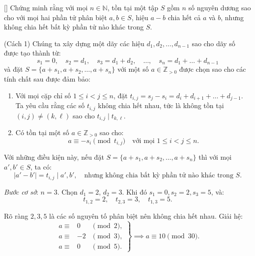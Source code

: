\documentclass[../09-contruction-methods.tex]{subfiles}
\begin{document}
\begin{example*}\label{example:USA-2015-TST-P2}[\textbf{}]
	Chứng minh rằng với mọi \( n \in \mathbb{N} \), tồn tại một tập \( S \) gồm \( n \) số nguyên dương sao cho với mọi hai phần tử phân biệt \( a, b \in S \),
	hiệu \( a - b \) chia hết cả \( a \) và \( b \), nhưng không chia hết bất kỳ phần tử nào khác trong \( S \).
\end{example*}

\begin{soln}(Cách 1)\footnotemark
	Chúng ta xây dựng một dãy các hiệu \( d_1, d_2, \dots, d_{n-1} \) sao cho dãy số được tạo thành từ:
	\[
		s_1 = 0, \quad s_2 = d_1, \quad s_3 = d_1 + d_2, \quad \dots, \quad s_n = d_1 + \dots + d_{n-1}
	\]
	và đặt \( S = \{ a + s_1, a + s_2, \dots, a + s_n \} \) với một số \( a \in \mathbb{Z}_{>0} \) được chọn sao cho các tính chất sau được đảm bảo:
	
	\begin{enumerate}[topsep=0pt, partopsep=0pt, itemsep=0pt, label=(\roman*)]
		\item Với mọi cặp chỉ số \( 1 \le i < j \le n \), đặt \( t_{i,j} = s_j - s_i = d_i + d_{i+1} + \dots + d_{j-1} \).
		Ta yêu cầu rằng các số \( t_{i,j} \) không chia hết nhau, tức là không tồn tại \( (i, j) \ne (k, \ell) \) sao cho \( t_{i,j} \mid t_{k,\ell} \).
		\item Có tồn tại một số \( a \in \mathbb{Z}_{>0} \) sao cho:
		\[
			a \equiv -s_i \pmod{t_{i,j}} \quad \text{với mọi } 1 \le i < j \le n.
		\]
	\end{enumerate}
	
	Với những điều kiện này, nếu đặt \( S = \{ a + s_1, a + s_2, \dots, a + s_n \} \) thì với mọi \( a', b' \in S \), ta có:
	\[
		|a' - b'| = t_{i,j} \mid a', b', \quad \text{nhưng không chia bất kỳ phần tử nào khác trong } S.
	\]
	
	\textit{Bước cơ sở}: \( n = 3 \). Chọn \( d_1 = 2 \), \( d_2 = 3 \). Khi đó \( s_1 = 0, s_2 = 2, s_3 = 5 \), và:
	\[
		t_{1,2} = 2, \quad t_{2,3} = 3, \quad t_{1,3} = 5.
	\]
	
	Rõ ràng \( 2, 3, 5 \) là các số nguyên tố phân biệt nên không chia hết nhau.  
	Giải hệ:
	\[
		\left.
		\begin{array}{rcl}
			a \equiv &0& \pmod{2}, \\
			a \equiv &-2& \pmod{3}, \\
			a \equiv &0& \pmod{5}.
		\end{array}
		\right\}
		\implies a \equiv 10 \pmod{30}.
	\]
	

\end{soln}
\end{document}
